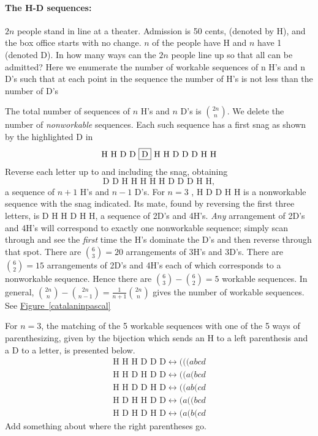 \documentclass[10pt,]{book}
\theoremstyle{plain}
\theoremstyle{definition}
\theoremstyle{definition}
\theoremstyle{definition}
\theoremstyle{definition}
\numberwithin{equation}{chapter}
\newcommand{\alert}{\fbox}
\begin{document}
\paragraph[{The H-D sequences:}]{The H-D sequences:}\hypertarget{paragraphs-8}{}
\hypertarget{p-897}{}%
\(2n\) people stand in line at a theater. Admission is 50 cents, (denoted by H), and the box office starts with no change. \(n\) of the people have H and \(n\) have \textdollar{}1 (denoted D). In how many ways can the \(2n\) people line up so that all can be admitted? Here we enumerate the number of workable sequences of n H's and n D's such that at each point in the sequence the number of H's is not less than the number of D's%
\par
\hypertarget{p-898}{}%
The total number of sequences of \(n\) H's and \(n\) D's is \(\binom{2n}{n}\). We delete the number of \emph{nonworkable} sequences. Each such sequence has a first snag as shown by the highlighted D in%
\begin{equation*}
\text{H\ H\ D\ D\ \alert{D}\ H\ H\ D\ D\ D\ H\ H}
\end{equation*}
Reverse each letter up to and including the snag, obtaining%
\begin{equation*}
\text{D D H H H H H D D D H H},
\end{equation*}
a sequence of \(n+1\) H's and \(n-1\) D's. For \(n = 3\) , H D \alert{D} D H H is a nonworkable sequence with the snag indicated. Its mate, found by reversing the first three letters, is D H H D H H, a sequence of 2D's and 4H's. \emph{Any} arrangement of 2D's and 4H's will correspond to exactly one nonworkable sequence; simply scan through and see the \emph{first} time the H's dominate the D's and then reverse through that spot. There are \(\binom{6}{3}
= 20\) arrangements of 3H's and 3D's. There are \(\binom{6}{2}
= 15\) arrangements of 2D's and 4H's each of which corresponds to a nonworkable sequence. Hence there are \(\binom{6}{3}
-\binom{6}{2} = 5\) workable sequences. In general, \(\binom{2n}{n}  - \binom{2n}{n - 1} = \frac{1}{n + 1}\binom{2n}{n}\) gives the number of workable sequences. See \hyperref[catalaninpascal]{Figure~\ref{catalaninpascal}}%
\par
\hypertarget{p-899}{}%
For \(n=3\), the matching of the 5 workable sequences with one of the 5 ways of parenthesizing, given by the bijection which sends an H to a left parenthesis and a D to a letter, is presented below.%
%
\begin{gather*}
\text{H H H D D D} \leftrightarrow  (((abcd \\
\text{H H D H D D} \leftrightarrow  ((a(bcd \\
\text{H H D D H D} \leftrightarrow  ((ab(cd \\
\text{H D H H D D} \leftrightarrow  (a((bcd \\
\text{H D H D H D} \leftrightarrow  (a(b(cd 
\end{gather*}
Add something about where the right parentheses go.\typeout{************************************************}
\typeout{************************************************}
\end{document}
